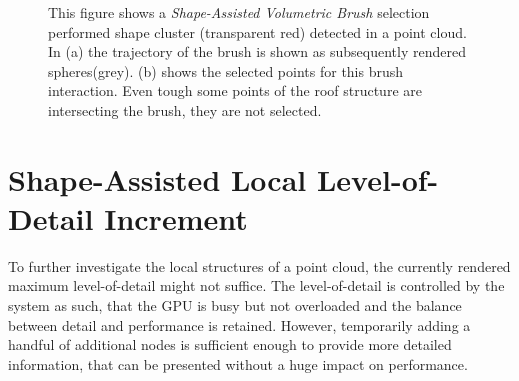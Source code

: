 \begin{figure}
\centering
{}\par\medskip
{}
\caption{This figure shows a \textit{Shape-Assisted Volumetric Brush} selection performed shape cluster (transparent red) detected in a point cloud. In (a) the trajectory of the brush is shown as subsequently rendered spheres(grey). (b) shows the selected points for this brush interaction. Even tough some points of the roof structure are intersecting the brush, they are not selected. }
\label{fig:brush}
\end{figure}


\section{Shape-Assisted Local Level-of-Detail Increment}
\label{sec:lod_increment}
To further investigate the local structures of a point cloud, the currently rendered maximum level-of-detail might not suffice. The level-of-detail is controlled by the system as such, that the GPU is busy but not overloaded and the balance between detail and performance is retained. However, temporarily adding a handful of additional nodes is sufficient enough to provide more detailed information, that can be presented without a huge impact on performance.
\\

